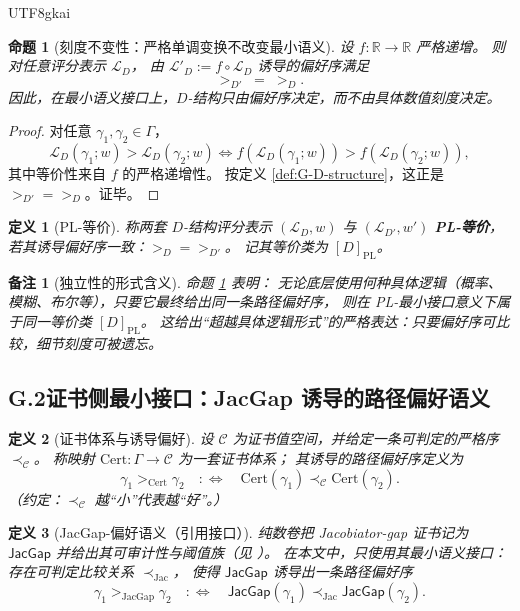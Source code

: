 \documentclass[12pt]{article}
\newtheorem{definition}{定义}[section]
\newtheorem{proposition}{命题}[section]
\newtheorem{remark}{备注}[section]
\begin{document}
\begin{CJK*}{UTF8}{gkai}
\begin{proposition}[刻度不变性：严格单调变换不改变最小语义]\label{prop:G-monotone-invariance}
设 $f:\mathbb{R}\to\mathbb{R}$ 严格递增。
则对任意评分表示 $\mathcal{L}_D$，
由 $\mathcal{L}'_D:=f\circ \mathcal{L}_D$ 诱导的偏好序满足
\[
  >_{D'} \;=\; >_{D}.
\]
因此，在最小语义接口上，$D$-结构只由偏好序决定，而不由具体数值刻度决定。
\end{proposition}

\begin{proof}
对任意 $\gamma_1,\gamma_2\in\Gamma$，
\[
  \mathcal{L}_D(\gamma_1;w)>\mathcal{L}_D(\gamma_2;w)
  \Longleftrightarrow
  f(\mathcal{L}_D(\gamma_1;w))>f(\mathcal{L}_D(\gamma_2;w)),
\]
其中等价性来自 $f$ 的严格递增性。
按定义 \ref{def:G-D-structure}，这正是 $>_{D'}=>_D$。证毕。
\end{proof}

\begin{definition}[PL-等价]\label{def:G-PL-equivalence}
称两套 $D$-结构评分表示 $(\mathcal{L}_D,w)$ 与 $(\mathcal{L}_{D'},w')$ \textbf{PL-等价}，
若其诱导偏好序一致：$>_D = >_{D'}$。
记其等价类为 $[D]_{\mathrm{PL}}$。
\end{definition}

\begin{remark}[独立性的形式含义]
命题 \ref{prop:G-monotone-invariance} 表明：
无论底层使用何种具体逻辑（概率、模糊、布尔等），只要它最终给出同一条路径偏好序，
则在 PL-最小接口意义下属于同一等价类 $[D]_{\mathrm{PL}}$。
这给出“超越具体逻辑形式”的严格表达：\emph{只要偏好序可比较，细节刻度可被遗忘。}
\end{remark}

\subsection{G.2\;证书侧最小接口：JacGap 诱导的路径偏好语义}

\begin{definition}[证书体系与诱导偏好]\label{def:G-certificate-order}
设 $\mathcal{C}$ 为证书值空间，并给定一条可判定的严格序 $\prec_{\mathcal{C}}$。
称映射 $\mathrm{Cert}:\Gamma\to\mathcal{C}$ 为一套证书体系；
其诱导的路径偏好序定义为
\[
  \gamma_1 >_{\mathrm{Cert}} \gamma_2
  \quad:\Longleftrightarrow\quad
  \mathrm{Cert}(\gamma_1)\prec_{\mathcal{C}}\mathrm{Cert}(\gamma_2).
\]
（约定：$\prec_{\mathcal{C}}$ 越“小”代表越“好”。）
\end{definition}

\begin{definition}[JacGap-偏好语义（引用接口）]\label{def:G-jacgap-preference}
纯数卷把 Jacobiator-gap 证书记为 $\mathsf{JacGap}$ 并给出其可审计性与阈值族（见 \cite{GaoZheng2025GFramework}）。
在本文中，只使用其最小语义接口：存在可判定比较关系 $\prec_{\mathrm{Jac}}$，
使得 $\mathsf{JacGap}$ 诱导出一条路径偏好序
\[
  \gamma_1 >_{\mathrm{JacGap}} \gamma_2
  \quad:\Longleftrightarrow\quad
  \mathsf{JacGap}(\gamma_1)\prec_{\mathrm{Jac}}\mathsf{JacGap}(\gamma_2).
\]
\end{definition}


\end{CJK*}
\end{document}
